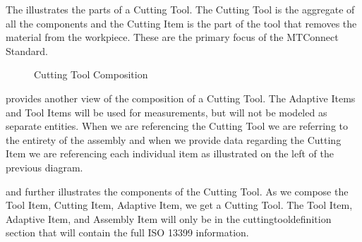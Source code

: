 \documentclass{mtconnect}	%
\begin{document}
The  illustrates the parts of a Cutting Tool.  The Cutting Tool is the aggregate of all the components and the Cutting Item is the part of the tool that removes the material from the workpiece.  These are the primary focus of the MTConnect Standard. 

\begin{figure}[ht]
  \centering
  \caption{Cutting Tool Composition}
  \label{fig:cutting-tool-composition}
\end{figure}

\FloatBarrier

 provides another view of the composition of a Cutting Tool.  The Adaptive Items and Tool Items will be used for measurements, but will not be modeled as separate entities.  When we are referencing the Cutting Tool we are referring to the entirety of the assembly and when we provide data regarding the Cutting Item we are referencing each individual item as illustrated on the left of the previous diagram.

 and  further illustrates the components of the Cutting Tool.  As we compose the Tool Item, Cutting Item, Adaptive Item, we get a Cutting Tool.  The Tool Item, Adaptive Item, and Assembly Item will only be in the \gls{cuttingtooldefinition} section that will contain the full ISO 13399 information.
\end{document}
